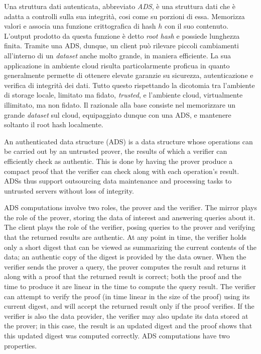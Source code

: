 		Una struttura dati autenticata, abbreviato \textit{ADS}, è una struttura dati che è adatta a controlli sulla sua integrità, cosi come su porzioni di essa. Memorizza valori e associa una funzione crittografica di hash $ h $ con il suo contenuto. L'output prodotto da questa funzione è detto \textit{root hash} e possiede lunghezza finita. Tramite una ADS, dunque, un client può rilevare piccoli cambiamenti all'interno di un \textit{dataset} anche molto grande, in maniera efficiente.
		La sua applicazione in ambiente cloud risulta particolarmente proficua in quanto generalmente permette di ottenere elevate garanzie su sicurezza, autenticazione e verifica di integrità dei dati. Tutto questo rispettando la dicotomia tra l'ambiente di storage locale, limitato ma fidato, \textit{trusted}, e l'ambiente cloud, virtualmente illimitato, ma non fidato. Il razionale alla base consiste nel memorizzare un grande \textit{dataset} sul cloud, equipaggiato dunque con una ADS, e mantenere soltanto il root hash localmente.
		
		An authenticated data structure (ADS) is a data structure whose operations can be carried out by an untrusted prover, the results of which a verifier can efficiently check as authentic. This is done by having the prover produce a compact proof that the verifier can check along with each operation’s result. ADSs thus support outsourcing data maintenance and processing tasks to untrusted servers without loss of integrity.
		
		ADS computations involve two roles, the prover and the verifier. The mirror plays the role of the prover, storing the data of interest and answering queries about it. The client plays the role of the verifier, posing queries to the prover and verifying that the returned results are authentic. At any point in time, the verifier holds only a short digest that can be viewed as summarizing the current contents of the data; an authentic copy of the digest is provided by the data owner. When the verifier sends the prover a query, the prover computes the result and returns it along with a proof that the returned result is correct; both the proof and the time to produce it are linear in the time to compute the query result. The verifier can attempt to verify the proof (in time linear in the size of the proof) using its current digest, and will accept the returned result only if the proof verifies. If the verifier is also the data provider, the verifier may also update its data stored at the prover; in this case, the result is an updated digest and the proof shows that this updated digest was computed correctly. ADS computations have two properties. 
		
